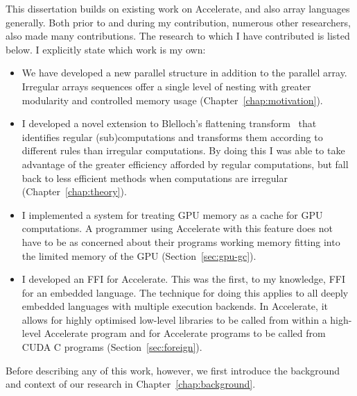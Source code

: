 This dissertation builds on existing work on Accelerate, and also array languages generally. Both prior to and during my contribution, numerous other researchers, also made many contributions. The research to which I have contributed is listed below. I explicitly state which work is my own:

\begin{itemize}
\item We have developed a new parallel structure in addition to the parallel array. Irregular arrays sequences offer a single level of nesting with greater modularity and controlled memory usage (Chapter~\ref{chap:motivation}).
\item I developed a novel extension to Blelloch's flattening transform~\cite{Blelloch:compiling1988,Blelloch:nesl1995} that identifies regular (sub)computations and transforms them according to different rules than irregular computations. By doing this I was able to take advantage of the greater efficiency afforded by regular computations, but fall back to less efficient methods when computations are irregular (Chapter~\ref{chap:theory}).
\item I implemented a system for treating GPU memory as a cache for GPU computations. A programmer using Accelerate with this feature does not have to be as concerned about their programs working memory fitting into the limited memory of the GPU (Section~\ref{sec:gpu-gc}).
\item I developed an FFI for Accelerate. This was the first, to my knowledge, FFI for an embedded language. The technique for doing this applies to all deeply embedded languages with multiple execution backends. In Accelerate, it allows for highly optimised low-level libraries to be called from within a high-level Accelerate program and for Accelerate programs to be called from CUDA C programs (Section~\ref{sec:foreign}).
\end{itemize}

Before describing any of this work, however, we first introduce the background and context of our research in Chapter~\ref{chap:background}.
